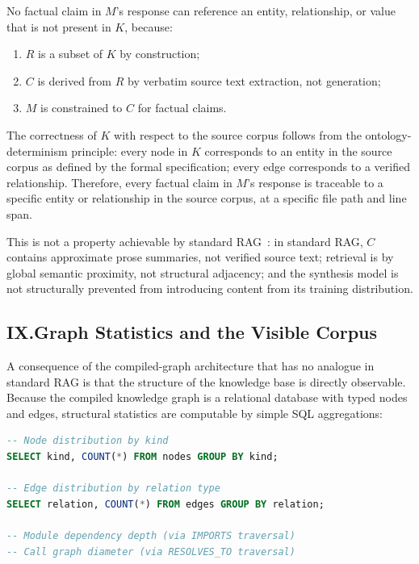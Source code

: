 \documentclass[12pt]{article}
\begin{document}
No factual claim in $M$'s response can reference an entity, relationship, or
value that is not present in $K$, because:
\begin{enumerate}[label=(\roman*), leftmargin=2em]
  \item $R$ is a subset of $K$ by construction;
  \item $C$ is derived from $R$ by verbatim source text extraction, not
    generation;
  \item $M$ is constrained to $C$ for factual claims.
\end{enumerate}

The correctness of $K$ with respect to the source corpus follows from the
ontology-determinism principle: every node in $K$ corresponds to an entity in the
source corpus as defined by the formal specification; every edge corresponds to a
verified relationship. Therefore, every factual claim in $M$'s response is
traceable to a specific entity or relationship in the source corpus, at a
specific file path and line span.

This is not a property achievable by standard RAG~\cite{lewis2020rag}: in
standard RAG, $C$ contains approximate prose summaries, not verified source text;
retrieval is by global semantic proximity, not structural adjacency; and the
synthesis model is not structurally prevented from introducing content from its
training distribution.

\subsection{IX.\quad Graph Statistics and the Visible Corpus}

A consequence of the compiled-graph architecture that has no analogue in standard
RAG is that the structure of the knowledge base is directly observable. Because
the compiled knowledge graph is a relational database with typed nodes and edges,
structural statistics are computable by simple SQL aggregations:

\begin{lstlisting}[language=SQL, caption={Representative SQL statistics queries over the compiled knowledge graph.}]
-- Node distribution by kind
SELECT kind, COUNT(*) FROM nodes GROUP BY kind;

-- Edge distribution by relation type
SELECT relation, COUNT(*) FROM edges GROUP BY relation;

-- Module dependency depth (via IMPORTS traversal)
-- Call graph diameter (via RESOLVES_TO traversal)
\end{lstlisting}
\end{document}
